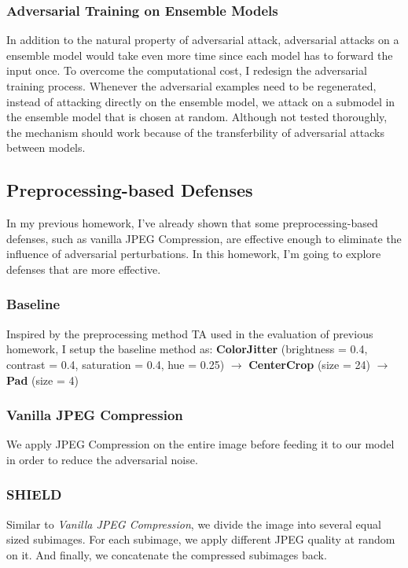 \documentclass{article}
\begin{document}
\subsubsection{Adversarial Training on Ensemble Models}
\label{section:adv-training-on-ensemble-models}
In addition to the natural property of adversarial attack, adversarial attacks on a ensemble model
would take even more time since each model has to forward the input once. To overcome the
computational cost, I redesign the adversarial training process. Whenever the adversarial examples
need to be regenerated, instead of attacking directly on the ensemble model, we attack on a submodel
in the ensemble model that is chosen at random. Although not tested thoroughly, the mechanism should
work because of the transferbility of adversarial attacks between models.

\subsection{Preprocessing-based Defenses}
In my previous homework, I've already shown that some preprocessing-based defenses, such as vanilla
JPEG Compression, are effective enough to eliminate the influence of adversarial perturbations. In
this homework, I'm going to explore defenses that are more effective.

\subsubsection{Baseline}
Inspired by the preprocessing method TA used in the evaluation of previous homework, I setup the
baseline method as: \textbf{ColorJitter} (brightness = 0.4, contrast = 0.4, saturation = 0.4, hue =
0.25) $\to$ \textbf{CenterCrop} (size = 24) $\to$ \textbf{Pad} (size = 4)

\subsubsection{Vanilla JPEG Compression}
We apply JPEG Compression on the entire image before feeding it to our model in order to reduce the
adversarial noise.

\subsubsection{SHIELD}
Similar to \textit{Vanilla JPEG Compression}, we divide the image into several equal sized
subimages. For each subimage, we apply different JPEG quality at random on it. And finally, we
concatenate the compressed subimages back.
\end{document}
